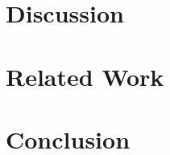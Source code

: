 \documentclass[11pt, a4paper]{article} %
\theoremstyle{definition}
\begin{document}

\section{Discussion}




\section{Related Work}




\section{Conclusion}

\newpage %

%
\end{document}
